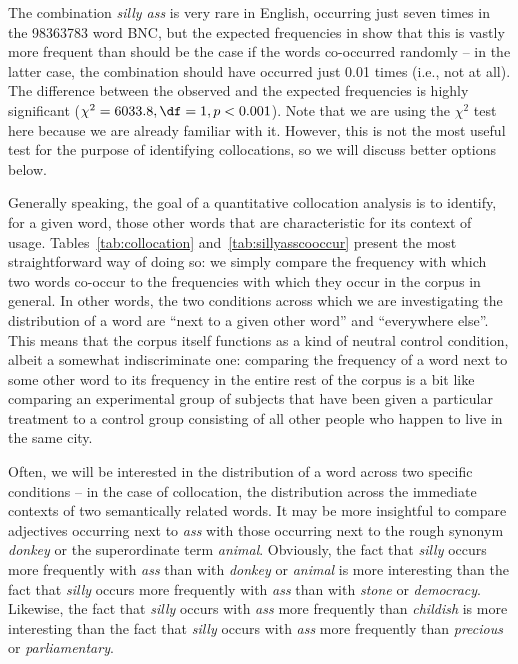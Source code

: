 The combination \textit{silly ass} is very rare in English, occurring just seven times in the \num{98363783} word BNC,  but the expected  frequencies in  show that this is vastly more frequent than should be the case if the words co\hyp{}occurred randomly  -- in the latter case, the combination should have occurred just 0.01 times (i.e., not at all). The difference between the observed and the expected frequencies is highly significant  ($\chi^2 = 6033.8, \df = 1, p < 0.001$). Note that we are using the $\chi^2$  test here because we are already familiar with it. However, this is not the most useful test for the purpose of identifying collocations,  so we will discuss better options below.

Generally speaking, the goal of a quantitative  collocation  analysis is to identify, for a given word, those other words that are characteristic for its context of usage. Tables~\ref{tab:collocation} and~\ref{tab:sillyasscooccur} present the most straightforward way of doing so: we simply compare the frequency  with which two words co\hyp{}occur to the frequencies with which they occur in the corpus in general. In other words, the two conditions across which we are investigating the distribution  of a word are ``next to a given other word'' and ``everywhere else''. This means that the corpus itself functions as a kind of neutral control condition, albeit a somewhat indiscriminate one: comparing the frequency  of a word next to some other word to its frequency in the entire rest of the corpus is a bit like comparing an experimental  group of subjects that have been given a particular treatment to a control group consisting of all other people who happen to live in the same city.

Often, we will be interested in the distribution  of a word across two specific conditions -- in the case of collocation,  the distribution across the immediate contexts of two semantically  related words. It may be more insightful to compare adjectives  occurring next to \textit{ass} with those occurring next to the rough synonym  \textit{donkey} or the superordinate term \textit{animal}. Obviously, the fact that \textit{silly} occurs more frequently with \textit{ass} than with \textit{donkey} or \textit{animal} is more interesting than the fact that \textit{silly} occurs more frequently with \textit{ass} than with \textit{stone} or \textit{democracy}. Likewise, the fact that \textit{silly} occurs with \textit{ass} more frequently than \textit{childish} is more interesting than the fact that \textit{silly} occurs with \textit{ass} more frequently than \textit{precious} or \textit{parliamentary}.

